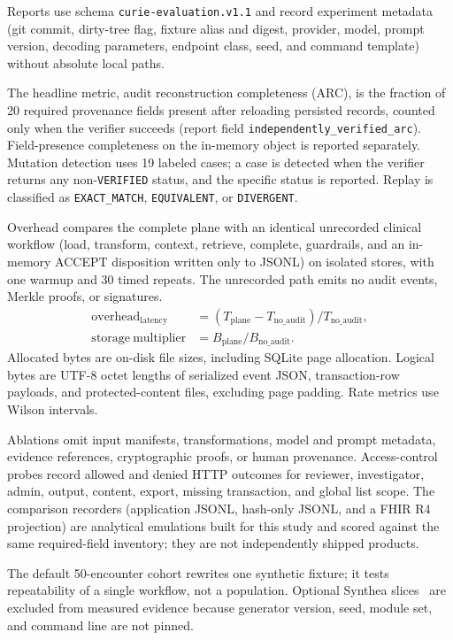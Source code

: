 \documentclass[preprint,review,12pt]{elsarticle}
\begin{document}
Reports use schema \texttt{curie-evaluation.v1.1} and record experiment
metadata (git commit, dirty-tree flag, fixture alias and digest, provider,
model, prompt version, decoding parameters, endpoint class, seed, and command
template) without absolute local paths.

The headline metric, audit reconstruction completeness (ARC), is the fraction
of 20 required provenance fields present after reloading persisted records,
counted only when the verifier succeeds (report field
\texttt{independently\_verified\_arc}). Field-presence completeness on the
in-memory object is reported separately. Mutation detection uses 19 labeled
cases; a case is detected when the verifier returns any
non-\texttt{VERIFIED} status, and the specific status is reported. Replay is
classified as \texttt{EXACT\_MATCH}, \texttt{EQUIVALENT}, or
\texttt{DIVERGENT}.

Overhead compares the complete plane with an identical unrecorded clinical
workflow (load, transform, context, retrieve, complete, guardrails, and an
in-memory ACCEPT disposition written only to JSONL) on isolated stores, with
one warmup and 30 timed repeats. The unrecorded path emits no audit events,
Merkle proofs, or signatures.
\begin{align}
\mathrm{overhead}_{\mathrm{latency}} &= (T_{\mathrm{plane}}-T_{\mathrm{no\_audit}})/T_{\mathrm{no\_audit}}, \\
\mathrm{storage\ multiplier} &= B_{\mathrm{plane}}/B_{\mathrm{no\_audit}}.
\end{align}
Allocated bytes are on-disk file sizes, including SQLite page allocation.
Logical bytes are UTF-8 octet lengths of serialized event JSON,
transaction-row payloads, and protected-content files, excluding page
padding. Rate metrics use Wilson intervals.

Ablations omit input manifests, transformations, model and prompt metadata,
evidence references, cryptographic proofs, or human provenance.
Access-control probes record allowed and denied HTTP outcomes for reviewer,
investigator, admin, output, content, export, missing transaction, and global
list scope. The comparison recorders (application JSONL, hash-only JSONL, and
a FHIR R4 projection) are analytical emulations built for this study and
scored against the same required-field inventory; they are not independently
shipped products.

The default 50-encounter cohort rewrites one synthetic fixture; it tests
repeatability of a single workflow, not a population. Optional Synthea
slices~\cite{walonoski2018synthea} are excluded from measured evidence because
generator version, seed, module set, and command line are not pinned.
\end{document}
